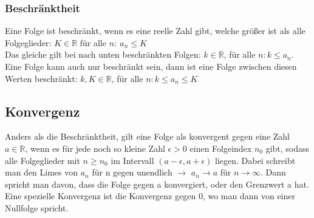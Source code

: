 \documentclass{article}
\newcommand{\R}{\mathbb{R}}
\begin{document}
	\subsubsection{Beschränktheit}
	Eine Folge ist beschränkt, wenn es eine reelle Zahl gibt, welche größer ist als alle Folgeglieder: $K\in\R$ für alle $n:\ a_n\leq K$ \\
	Das gleiche gilt bei nach unten beschränkten Folgen: $k\in\R$, für alle $n:k\leq a_n$. \\
	Eine Folge kann auch nur beschränkt sein, dann ist eine Folge zwischen diesen Werten beschränkt: $k,K\in\R$, für alle $n:k\leq a_n \leq K$
	\subsection{Konvergenz}
	Anders als die Beschränktheit, gilt eine Folge als konvergent gegen eine Zahl $a\in\R$, wenn es für jede noch so kleine Zahl $\epsilon > 0$ einen Folgeindex $n_0$ gibt, sodass alle Folgeglieder mit $n\geq n_0$ im Intervall $(a-\epsilon, a+\epsilon)$ liegen. Dabei schreibt man den Limes von $a_n$ für n gegen unendlich $\to$ $a_n\to a$ für $n \to \infty$. Dann spricht man davon, dass die Folge gegen a konvergiert, oder den Grenzwert a hat. Eine spezielle Konvergenz ist die Konvergenz gegen 0, wo man dann von einer Nullfolge spricht.
\end{document}

